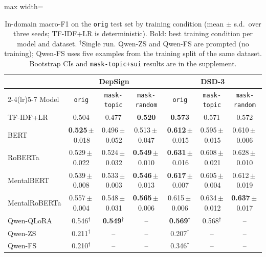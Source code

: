 \begin{table}[t]
\centering
\caption{In-domain macro-F1 on the \texttt{orig} test set by training condition (mean $\pm$ s.d.\ over three seeds; TF-IDF+LR is deterministic). Bold: best training condition per model and dataset. $^{\dagger}$Single run. Qwen-ZS and Qwen-FS are prompted (no training); Qwen-FS uses five examples from the training split of the same dataset. Bootstrap CIs and \texttt{mask-topic+sui} results are in the supplement.}\label{tab:indomain}
\scriptsize
\setlength{\tabcolsep}{3pt}
\begin{adjustbox}{max width=\textwidth}
\begin{tabular}{lcccccc}
\toprule
 & \multicolumn{3}{c}{DepSign} & \multicolumn{3}{c}{DSD-3} \\
\cmidrule(lr){2-4}\cmidrule(lr){5-7}
Model & \texttt{orig} & \texttt{mask-topic} & \texttt{mask-random} & \texttt{orig} & \texttt{mask-topic} & \texttt{mask-random} \\
\midrule
TF-IDF+LR & 0.504 & 0.477 & \textbf{0.520} & \textbf{0.573} & 0.571 & 0.572 \\
BERT & \textbf{0.525}\,$\pm$\,0.018 & 0.496\,$\pm$\,0.052 & 0.513\,$\pm$\,0.047 & \textbf{0.612}\,$\pm$\,0.015 & 0.595\,$\pm$\,0.015 & 0.610\,$\pm$\,0.006 \\
RoBERTa & 0.529\,$\pm$\,0.022 & 0.524\,$\pm$\,0.032 & \textbf{0.549}\,$\pm$\,0.010 & \textbf{0.631}\,$\pm$\,0.016 & 0.608\,$\pm$\,0.021 & 0.628\,$\pm$\,0.010 \\
MentalBERT & 0.539\,$\pm$\,0.008 & 0.533\,$\pm$\,0.003 & \textbf{0.546}\,$\pm$\,0.013 & \textbf{0.617}\,$\pm$\,0.007 & 0.605\,$\pm$\,0.004 & 0.612\,$\pm$\,0.019 \\
MentalRoBERTa & 0.557\,$\pm$\,0.004 & 0.548\,$\pm$\,0.031 & \textbf{0.565}\,$\pm$\,0.006 & 0.615\,$\pm$\,0.006 & 0.634\,$\pm$\,0.012 & \textbf{0.637}\,$\pm$\,0.017 \\
Qwen-QLoRA & 0.546$^{\dagger}$ & \textbf{0.549}$^{\dagger}$ & -- & \textbf{0.569}$^{\dagger}$ & 0.568$^{\dagger}$ & -- \\
\midrule
Qwen-ZS & 0.211$^{\dagger}$ & -- & -- & 0.207$^{\dagger}$ & -- & -- \\
Qwen-FS & 0.210$^{\dagger}$ & -- & -- & 0.346$^{\dagger}$ & -- & -- \\
\bottomrule
\end{tabular}
\end{adjustbox}
\end{table}
